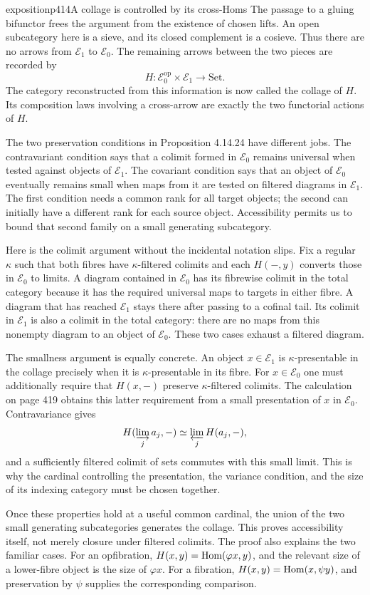 \begin{dcomment}{exposition}{p414}{A collage is controlled by its cross-Homs}
The passage to a gluing bifunctor frees the argument from the existence of chosen lifts. An open subcategory here is a sieve, and its closed complement is a cosieve. Thus there are no arrows from $\mathcal E_1$ to $\mathcal E_0$. The remaining arrows between the two pieces are recorded by
\[
 H:\mathcal E_0^{\mathrm{op}}\times\mathcal E_1\longrightarrow\mathrm{Set}.
\]
The category reconstructed from this information is now called the collage of $H$. Its composition laws involving a cross-arrow are exactly the two functorial actions of $H$.

The two preservation conditions in Proposition 4.14.24 have different jobs. The contravariant condition says that a colimit formed in $\mathcal E_0$ remains universal when tested against objects of $\mathcal E_1$. The covariant condition says that an object of $\mathcal E_0$ eventually remains small when maps from it are tested on filtered diagrams in $\mathcal E_1$. The first condition needs a common rank for all target objects; the second can initially have a different rank for each source object. Accessibility permits us to bound that second family on a small generating subcategory.

Here is the colimit argument without the incidental notation slips. Fix a regular $\kappa$ such that both fibres have $\kappa$-filtered colimits and each $H(-,y)$ converts those in $\mathcal E_0$ to limits. A diagram contained in $\mathcal E_0$ has its fibrewise colimit in the total category because it has the required universal maps to targets in either fibre. A diagram that has reached $\mathcal E_1$ stays there after passing to a cofinal tail. Its colimit in $\mathcal E_1$ is also a colimit in the total category: there are no maps from this nonempty diagram to an object of $\mathcal E_0$. These two cases exhaust a filtered diagram.

The smallness argument is equally concrete. An object $x\in\mathcal E_1$ is $\kappa$-presentable in the collage precisely when it is $\kappa$-presentable in its fibre. For $x\in\mathcal E_0$ one must additionally require that $H(x,-)$ preserve $\kappa$-filtered colimits. The calculation on page 419 obtains this latter requirement from a small presentation of $x$ in $\mathcal E_0$. Contravariance gives
\[
 H(\varinjlim_j a_j,-)\simeq\varprojlim_jH(a_j,-),
\]
and a sufficiently filtered colimit of sets commutes with this small limit. This is why the cardinal controlling the presentation, the variance condition, and the size of its indexing category must be chosen together.

Once these properties hold at a useful common cardinal, the union of the two small generating subcategories generates the collage. This proves accessibility itself, not merely closure under filtered colimits. The proof also explains the two familiar cases. For an opfibration, $H(x,y)=\operatorname{Hom}(\varphi x,y)$, and the relevant size of a lower-fibre object is the size of $\varphi x$. For a fibration, $H(x,y)=\operatorname{Hom}(x,\psi y)$, and preservation by $\psi$ supplies the corresponding comparison.
\end{dcomment}


